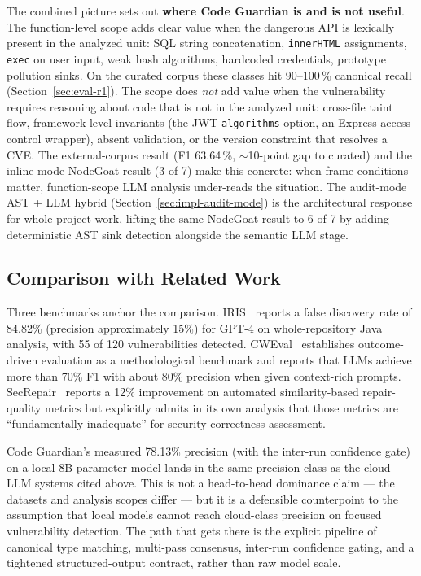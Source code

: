 The combined picture sets out \textbf{where Code Guardian is and is not useful}. The function-level scope adds clear value when the dangerous API is lexically present in the analyzed unit: SQL string concatenation, \texttt{innerHTML} assignments, \texttt{exec} on user input, weak hash algorithms, hardcoded credentials, prototype pollution sinks. On the curated corpus these classes hit 90--100\,\% canonical recall (Section~\ref{sec:eval-r1}). The scope does \emph{not} add value when the vulnerability requires reasoning about code that is not in the analyzed unit: cross-file taint flow, framework-level invariants (the JWT \texttt{algorithms} option, an Express access-control wrapper), absent validation, or the version constraint that resolves a CVE. The external-corpus result (F1 63.64\,\%, $\sim$10-point gap to curated) and the inline-mode NodeGoat result (3 of 7) make this concrete: when frame conditions matter, function-scope LLM analysis under-reads the situation. The audit-mode AST + LLM hybrid (Section~\ref{sec:impl-audit-mode}) is the architectural response for whole-project work, lifting the same NodeGoat result to 6 of 7 by adding deterministic AST sink detection alongside the semantic LLM stage.

\subsection{Comparison with Related Work}
\label{sec:eval-related-comparison}

Three benchmarks anchor the comparison. IRIS~\cite{li2025iris} reports a false discovery rate of 84.82\% (precision approximately 15\%) for GPT-4 on whole-repository Java analysis, with 55 of 120 vulnerabilities detected. CWEval~\cite{peng2025cweval} establishes outcome-driven evaluation as a methodological benchmark and reports that LLMs achieve more than 70\% F1 with about 80\% precision when given context-rich prompts. SecRepair~\cite{islam2024secrepair} reports a 12\% improvement on automated similarity-based repair-quality metrics but explicitly admits in its own analysis that those metrics are ``fundamentally inadequate'' for security correctness assessment.

Code Guardian's measured 78.13\% precision (with the inter-run confidence gate) on a local 8B-parameter model lands in the same precision class as the cloud-LLM systems cited above. This is not a head-to-head dominance claim --- the datasets and analysis scopes differ --- but it is a defensible counterpoint to the assumption that local models cannot reach cloud-class precision on focused vulnerability detection. The path that gets there is the explicit pipeline of canonical type matching, multi-pass consensus, inter-run confidence gating, and a tightened structured-output contract, rather than raw model scale.

